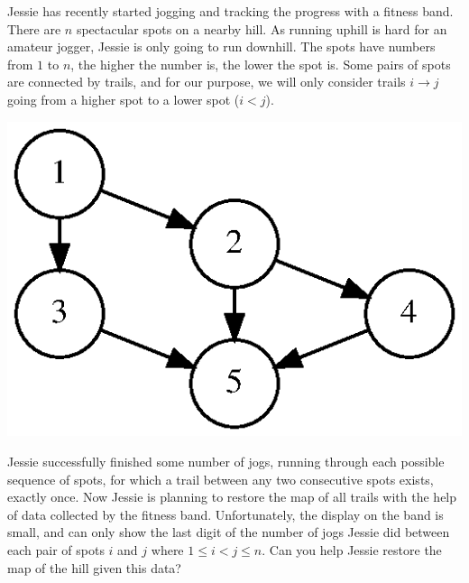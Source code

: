 Jessie has recently started jogging and tracking the progress with a fitness band. There are $n$ spectacular spots on a nearby hill. As running uphill is hard for an amateur jogger, Jessie is only going to run downhill. The spots have numbers from $1$ to $n$, the higher the number is, the lower the spot is. Some pairs of spots are connected by trails, and for our purpose, we will only consider trails $i \to j$ going from a higher spot to a lower spot ($i < j$).

\begin{center}
\includegraphics[bb=0 0 188 130]{graph.eps}
\end{center}

Jessie successfully finished some number of jogs, running through each possible sequence of spots, for which a trail between any two consecutive spots exists, exactly once.
Now Jessie is planning to restore the map of all trails with the help of data collected by the fitness band. Unfortunately, the display on the band is small, and can only show the last digit of the number of jogs Jessie did between each pair of spots $i$ and $j$ where $1 \le i < j \le n$. Can you help Jessie restore the map of the hill given this data?

 